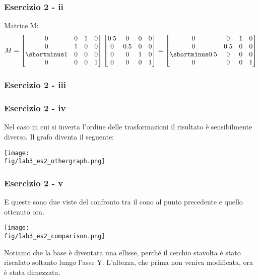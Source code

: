 \documentclass{beamer}
\newcommand{\fig}{figures} %
\begin{document}
\begin{frame}
\frametitle{Esercizio 2 - ii}
Matrice M:
\begin{displaymath}
M = 
\begin{bmatrix}
        0 & 0 & 1 & 0\\
        0 & 1 & 0 & 0 \\
        \shortminus 1 & 0 & 0 & 0 \\
        0 & 0 & 0 & 1 
\end{bmatrix}
\begin{bmatrix}
    0.5 & 0   & 0   & 0 \\
      0 & 0.5 & 0   & 0 \\
      0 & 0   & 1   & 0 \\
      0 & 0   & 0   & 1 
\end{bmatrix}
 = 
\begin{bmatrix}
        0 & 0 & 1 & 0\\
        0 & 0.5 & 0 & 0 \\
        \shortminus 0.5 & 0 & 0 & 0 \\
        0 & 0 & 0 & 1 
\end{bmatrix}
\end{displaymath}
\end{frame}

\begin{frame}
\frametitle{Esercizio 2 - iii}
\begin{center}
\end{center}
\end{frame}

\begin{frame}
\frametitle{Esercizio 2 - iv}
Nel caso in cui si inverta l'ordine delle trasformazioni il risultato \`e sensibilmente diverso.
Il grafo diventa il seguente:
    \vspace{0.25cm}
\begin{center}
\texttt{[image: \\fig/lab3\_es2\_othergraph.png]}
\end{center}

\end{frame}

\begin{frame}
\frametitle{Esercizio 2 - v}
E queste sono due viste del confronto tra il cono al punto precedente e quello ottenuto ora.
\begin{center}
\texttt{[image: \\fig/lab3\_es2\_comparison.png]}
\end{center}

Notiamo che la base \`e diventata una ellisse, perch\'e il cerchio stavolta \`e stato riscalato soltanto lungo l'asse Y.
    L'altezza, che prima non veniva modificata, ora \`e stata dimezzata.
\end{frame}
\end{document}
